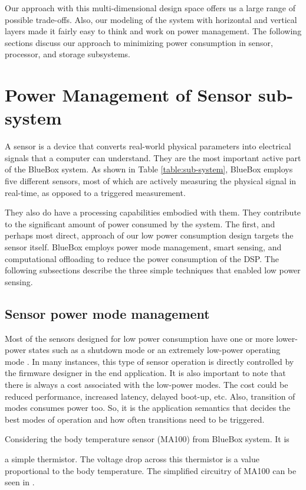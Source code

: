  
Our approach with this multi-dimensional design space offers us a
large range of possible trade-offs. Also, our modeling of the system
with horizontal and vertical layers made it fairly easy to think and
work on power management. The following sections discuss our approach
to minimizing power consumption in sensor, processor, and storage
subsystems.
 
 \section{Power Management of Sensor sub-system}
 
A sensor is a device that converts real-world physical parameters
into electrical signals that a computer can understand. They are the
most important active part of the BlueBox system. As shown in Table
\ref{table:sub-system}, BlueBox employs five different sensors, most
of which are actively measuring the physical signal in real-time, as
opposed to a triggered measurement.

They also do have a processing capabilities embodied with them. They
contribute to the significant amount of power consumed by the system.
The first, and perhaps most direct, approach of our low power
consumption design targets the sensor itself. BlueBox employs power
mode management, smart sensing, and computational offloading to
reduce the power consumption of the DSP. The following subsections
describe the three simple techniques that enabled low power sensing.

 \subsection{Sensor power mode management}

Most of the sensors designed for low power consumption have one or
more lower-power states such as a shutdown mode or an extremely
low-power operating mode \cite{lowpwrsensing}. In many instances,
this type of sensor operation is directly controlled by the firmware
designer in the end application. It is also important to note that
there is always a cost associated with the low-power modes.  The cost
could be reduced performance, increased latency, delayed boot-up,
etc. Also, transition of modes consumes power too. So, it is the
application semantics that decides the best modes of operation and
how often transitions need to be triggered. 
 
Considering the body temperature sensor (MA100) from BlueBox system.
It is

a simple thermistor. The voltage drop across this thermistor is a value
proportional to the body temperature. The simplified circuitry of
MA100 can be seen in .

